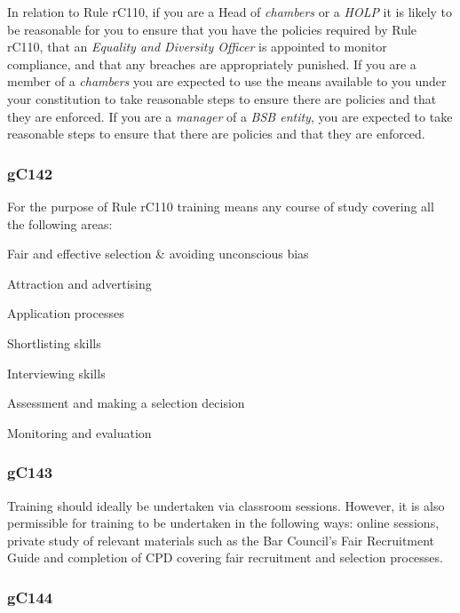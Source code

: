 In relation to Rule rC110, if you are a Head of \emph{chambers} or a
\emph{HOLP} it is likely to be reasonable for you to ensure that you
have the policies required by Rule rC110, that an \emph{Equality and
Diversity Officer} is appointed to monitor compliance, and that any
breaches are appropriately punished. If you are a member of a
\emph{chambers} you are expected to use the means available to you under
your constitution to take reasonable steps to ensure there are policies
and that they are enforced. If you are a \emph{manager} of a \emph{BSB
entity}, you are expected to take reasonable steps to ensure that there
are policies and that they are enforced.

\subsubsection{\color{darkgrey}gC142}

For the purpose of Rule rC110 training means any course of study
covering all the following areas:
\begin{alphlist}
\item Fair and effective selection \& avoiding unconscious bias

\item Attraction and advertising

\item Application processes

\item Shortlisting skills

\item Interviewing skills

\item Assessment and making a selection decision

\item Monitoring and evaluation
\end{alphlist}
\subsubsection{\color{darkgrey}gC143}

Training should ideally be undertaken via classroom sessions. However,
it is also permissible for training to be undertaken in the following
ways: online sessions, private study of relevant materials such as the
Bar Council's Fair Recruitment Guide and completion of CPD covering fair
recruitment and selection processes.

\subsubsection{\color{darkgrey}gC144}

